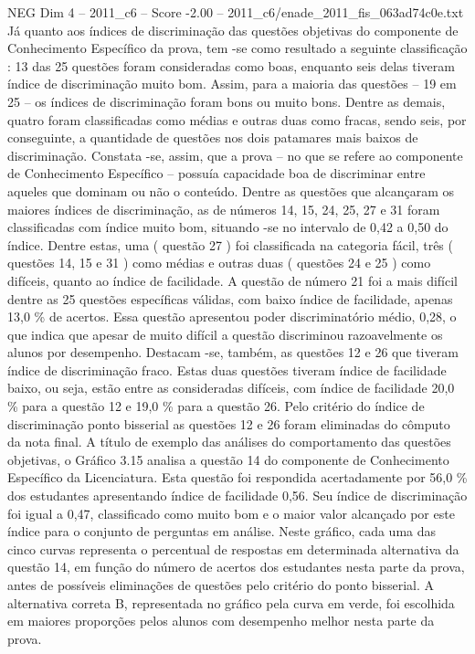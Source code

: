 \begin{textsample}{NEG Dim 4 – 2011\_c6 – Score -2.00 – 2011\_c6/enade\_2011\_fis\_063ad74c0e.txt}
Já quanto aos índices de discriminação das questões objetivas do componente de Conhecimento Específico da prova, tem -se como resultado a seguinte classificação : 13 das 25 questões foram consideradas como boas, enquanto seis delas tiveram índice de discriminação muito bom.
Assim, para a maioria das questões – 19 em 25 – os índices de discriminação foram bons ou muito bons.
Dentre as demais, quatro foram classificadas como médias e outras duas como fracas, sendo seis, por conseguinte, a quantidade de questões nos dois patamares mais baixos de discriminação.
Constata -se, assim, que a prova – no que se refere ao componente de Conhecimento Específico – possuía capacidade boa de discriminar entre aqueles que dominam ou não o conteúdo.
Dentre as questões que alcançaram os maiores índices de discriminação, as de números 14, 15, 24, 25, 27 e 31 foram classificadas com índice muito bom, situando -se no intervalo de 0,42 a 0,50 do índice.
Dentre estas, uma ( questão 27 ) foi classificada na categoria fácil, três ( questões 14, 15 e 31 ) como médias e outras duas ( questões 24 e 25 ) como difíceis, quanto ao índice de facilidade.
A questão de número 21 foi a mais difícil dentre as 25 questões específicas válidas, com baixo índice de facilidade, apenas 13,0 \% de acertos.
Essa questão apresentou poder discriminatório médio, 0,28, o que indica que apesar de muito difícil a questão discriminou razoavelmente os alunos por desempenho.
Destacam -se, também, as questões 12 e 26 que tiveram índice de discriminação fraco.
Estas duas questões tiveram índice de facilidade baixo, ou seja, estão entre as consideradas difíceis, com índice de facilidade 20,0 \% para a questão 12 e 19,0 \% para a questão 26.
Pelo critério do índice de discriminação ponto bisserial as questões 12 e 26 foram eliminadas do cômputo da nota final.
A título de exemplo das análises do comportamento das questões objetivas, o Gráfico 3.15 analisa a questão 14 do componente de Conhecimento Específico da Licenciatura.
Esta questão foi respondida acertadamente por 56,0 \% dos estudantes apresentando índice de facilidade 0,56.
Seu índice de discriminação foi igual a 0,47, classificado como muito bom e o maior valor alcançado por este índice para o conjunto de perguntas em análise.
Neste gráfico, cada uma das cinco curvas representa o percentual de respostas em determinada alternativa da questão 14, em função do número de acertos dos estudantes nesta parte da prova, antes de possíveis eliminações de questões pelo critério do ponto bisserial.
A alternativa correta B, representada no gráfico pela curva em verde, foi escolhida em maiores proporções pelos alunos com desempenho melhor nesta parte da prova.

\end{textsample}
